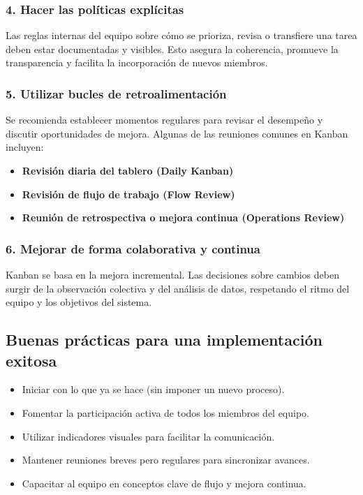 \subsubsection{4. Hacer las políticas explícitas}
Las reglas internas del equipo sobre cómo se prioriza, revisa o transfiere una tarea deben estar documentadas y visibles. Esto asegura la coherencia, promueve la transparencia y facilita la incorporación de nuevos miembros.

\subsubsection{5. Utilizar bucles de retroalimentación}
Se recomienda establecer momentos regulares para revisar el desempeño y discutir oportunidades de mejora. Algunas de las reuniones comunes en Kanban incluyen:
\begin{itemize}
    \item \textbf{Revisión diaria del tablero (Daily Kanban)}
    \item \textbf{Revisión de flujo de trabajo (Flow Review)}
    \item \textbf{Reunión de retrospectiva o mejora continua (Operations Review)}
\end{itemize}

\subsubsection{6. Mejorar de forma colaborativa y continua}
Kanban se basa en la mejora incremental. Las decisiones sobre cambios deben surgir de la observación colectiva y del análisis de datos, respetando el ritmo del equipo y los objetivos del sistema.

\subsection{Buenas prácticas para una implementación exitosa}

\begin{itemize}
    \item Iniciar con lo que ya se hace (sin imponer un nuevo proceso).
    \item Fomentar la participación activa de todos los miembros del equipo.
    \item Utilizar indicadores visuales para facilitar la comunicación.
    \item Mantener reuniones breves pero regulares para sincronizar avances.
    \item Capacitar al equipo en conceptos clave de flujo y mejora continua.
\end{itemize}

